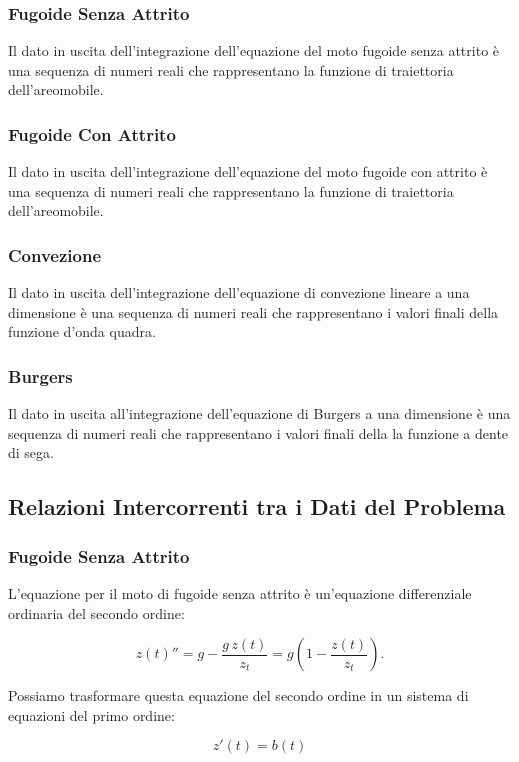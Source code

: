 \subsubsection*{Fugoide Senza Attrito}
Il dato in uscita dell'integrazione dell'equazione del moto fugoide senza attrito è una sequenza di numeri reali che rappresentano la funzione di traiettoria dell'areomobile.
\subsubsection*{Fugoide Con Attrito}
Il dato in uscita dell'integrazione dell'equazione del moto fugoide con attrito è una sequenza di numeri reali che rappresentano la funzione di traiettoria dell'areomobile.
\subsubsection*{Convezione}
Il dato in uscita dell'integrazione dell'equazione di convezione lineare a una dimensione è una sequenza di numeri reali che rappresentano i valori finali della funzione d'onda quadra.
\subsubsection*{Burgers}
Il dato in uscita all'integrazione dell'equazione di Burgers a una dimensione è una sequenza di numeri reali che rappresentano i valori finali della la funzione a dente di sega.

\subsection{Relazioni Intercorrenti tra i Dati del Problema}

\subsubsection*{Fugoide Senza Attrito}
L’equazione per il moto di fugoide senza attrito è un’equazione differenziale ordinaria del secondo ordine:

\begin{equation}
z(t)'' = g - \frac{g \,z(t)}{z_t} = g \left(1 - \frac{z(t)}{z_t}\right).
\end{equation}

\noindent
Possiamo trasformare questa equazione del secondo ordine in un sistema di equazioni del primo ordine:

\begin{equation}
z'(t) = b(t)
\end{equation}

